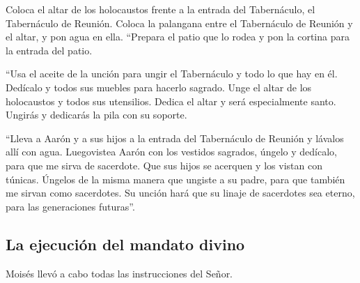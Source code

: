  Coloca el altar de los holocaustos frente a la entrada
del Tabernáculo, el Tabernáculo de Reunión.  Coloca la
palangana entre el Tabernáculo de Reunión y el altar, y pon agua en
ella.  ``Prepara el patio que lo rodea y pon la cortina
para la entrada del patio.

 ``Usa el aceite de la unción para ungir el Tabernáculo y
todo lo que hay en él. Dedícalo y todos sus muebles para hacerlo
sagrado.  Unge el altar de los holocaustos y todos sus
utensilios. Dedica el altar y será especialmente santo. 
Ungirás y dedicarás la pila con su soporte.

 ``Lleva a Aarón y a sus hijos a la entrada del
Tabernáculo de Reunión y lávalos allí con agua. 
Luegovistea Aarón con los vestidos sagrados, úngelo y dedícalo, para que
me sirva de sacerdote.  Que sus hijos se acerquen y los
vistan con túnicas.  Úngelos de la misma manera que
ungiste a su padre, para que también me sirvan como sacerdotes. Su
unción hará que su linaje de sacerdotes sea eterno, para las
generaciones futuras''.

\hypertarget{la-ejecuciuxf3n-del-mandato-divino}{%
\subsection{La ejecución del mandato
divino}\label{la-ejecuciuxf3n-del-mandato-divino}}

 Moisés llevó a cabo todas las instrucciones del Señor.

